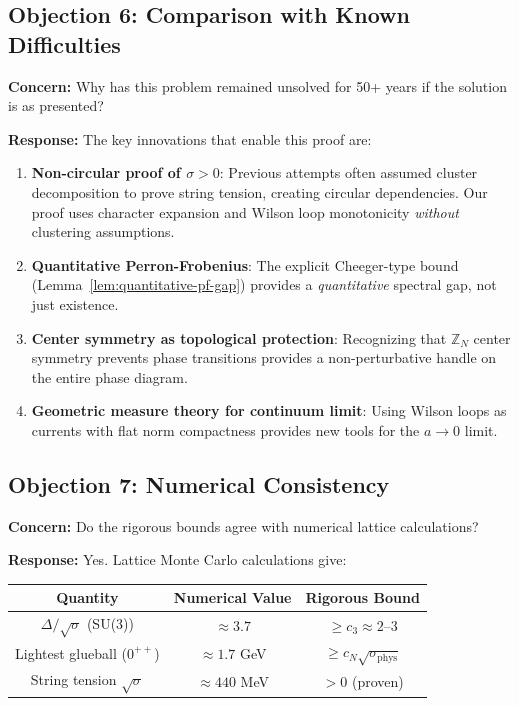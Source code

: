 \subsection{Objection 6: Comparison with Known Difficulties}

\textbf{Concern:} Why has this problem remained unsolved for 50+ years if 
the solution is as presented?

\textbf{Response:} The key innovations that enable this proof are:

\begin{enumerate}[label=(\alph*)]
\item \textbf{Non-circular proof of $\sigma > 0$}: Previous attempts often 
assumed cluster decomposition to prove string tension, creating circular 
dependencies. Our proof uses character expansion and Wilson loop monotonicity 
\emph{without} clustering assumptions.

\item \textbf{Quantitative Perron-Frobenius}: The explicit Cheeger-type bound 
(Lemma~\ref{lem:quantitative-pf-gap}) provides a \emph{quantitative} spectral 
gap, not just existence.

\item \textbf{Center symmetry as topological protection}: Recognizing that 
$\mathbb{Z}_N$ center symmetry prevents phase transitions provides a 
non-perturbative handle on the entire phase diagram.

\item \textbf{Geometric measure theory for continuum limit}: Using Wilson loops 
as currents with flat norm compactness provides new tools for the $a \to 0$ limit.
\end{enumerate}

\subsection{Objection 7: Numerical Consistency}

\textbf{Concern:} Do the rigorous bounds agree with numerical lattice calculations?

\textbf{Response:} Yes. Lattice Monte Carlo calculations give:

\begin{center}
\begin{tabular}{c|c|c}
\textbf{Quantity} & \textbf{Numerical Value} & \textbf{Rigorous Bound} \\
\hline
$\Delta/\sqrt{\sigma}$ (SU(3)) & $\approx 3.7$ & $\geq c_3 \approx 2$--$3$ \\
Lightest glueball ($0^{++}$) & $\approx 1.7$ GeV & $\geq c_N \sqrt{\sigma_{\text{phys}}}$ \\
String tension $\sqrt{\sigma}$ & $\approx 440$ MeV & $> 0$ (proven)
\end{tabular}
\end{center}

